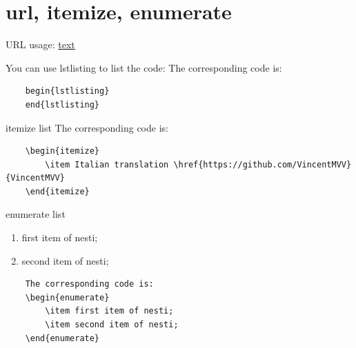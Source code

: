\documentclass[11pt]{elegantbook}
\begin{document}
\section{url, itemize, enumerate}
URL usage:
\href{URL}{text}

You can use lstlisting to list the code:
The corresponding code is: 
\begin{lstlisting}
	begin{lstlisting}
	end{lstlisting}
\end{lstlisting}

itemize list
The corresponding code is: 
\begin{lstlisting}
	\begin{itemize}
		\item Italian translation \href{https://github.com/VincentMVV}{VincentMVV} 
	\end{itemize}
\end{lstlisting}



enumerate list
\begin{enumerate}
	\item first item of nesti;
	\item second item of nesti;
\end{enumerate}
\begin{lstlisting}
	The corresponding code is: 
	\begin{enumerate}
		\item first item of nesti;
		\item second item of nesti;
	\end{enumerate}
\end{lstlisting}
\end{document}

